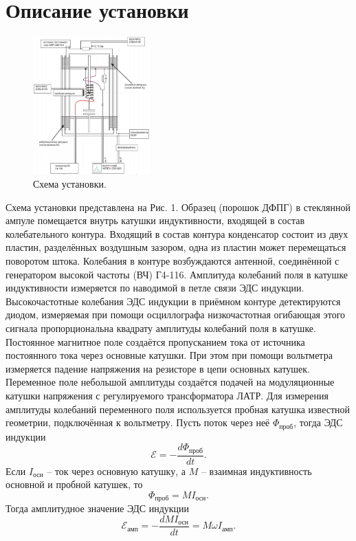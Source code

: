 \documentclass[a4paper,12pt]{article}
\begin{document}
\section*{Описание установки}
\begin{figure}
\includegraphics[width = 0.4\textwidth]{1.png}
\centering
\caption{Схема установки.}
\end{figure}
Схема установки представлена на Рис. 1. Образец (порошок ДФПГ) в стеклянной ампуле помещается внутрь катушки индуктивности, входящей в состав колебательного контура. Входящий в состав контура конденсатор состоит из двух пластин, разделённых воздушным зазором, одна из пластин может перемещаться поворотом штока. Колебания в контуре возбуждаются антенной, соединённой с генератором высокой частоты (ВЧ) Г4-116. Амплитуда колебаний поля в катушке индуктивности
измеряется по наводимой в петле связи ЭДС индукции. Высокочастотные колебания ЭДС
индукции в приёмном контуре детектируются диодом, измеряемая при помощи
осциллографа низкочастотная огибающая этого сигнала пропорциональна квадрату
амплитуды колебаний поля в катушке.\\
Постоянное магнитное поле создаётся пропусканием тока от источника постоянного тока через основные катушки. При этом при помощи вольтметра измеряется падение напряжения на резисторе в цепи основных катушек. Переменное поле небольшой амплитуды создаётся подачей на модуляционные катушки напряжения с регулируемого трансформатора ЛАТР. Для измерения амплитуды колебаний переменного поля используется пробная катушка известной геометрии, подключённая к вольтметру. Пусть поток через неё $\Phi_{\text{проб}}$, тогда ЭДС индукции
\[\mathcal{E} = - \dfrac{d\Phi_{\text{проб}}}{dt}.\]
Если $I_{\text{осн}}$ -- ток через основную катушку, а $M$ -- взаимная индуктивность основной и пробной катушек, то
\[\Phi_{\text{проб}} = M I_{\text{осн}}.\]
Тогда амплитудное значение ЭДС индукции
\[\mathcal{E}_{\text{амп}} = - \dfrac{dM I_{\text{осн}}}{dt} = M \omega I_{\text{амп}}.\]
\end{document}
